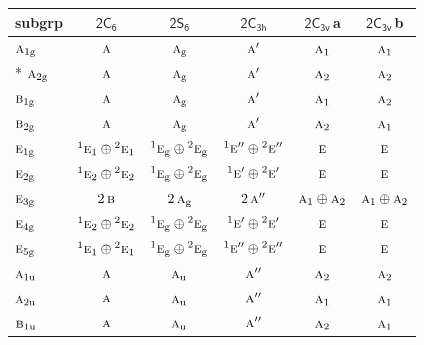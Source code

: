 \documentclass[10pt,a4paper]{article}
\numberwithin{equation}{section}
\newcommand{\grp}[1]{\mathsf{#1}}
\newcommand{\irr}[1]{\text{\normalfont\scshape #1}}
\newcommand{\conjpair}[1]{{}^{#1}}
\newcommand{\ptag}[1]{\mathrm{#1}}
\newcommand{\clsletter}[1]{\,{\scriptsize\color{black!55}#1}}
\begin{document}
{\small\begin{longtable}{@{}lccccc@{}}\toprule
subgrp & \href{2C6.pdf}{$\grp{2C_{6}}$} & \href{2S6.pdf}{$\grp{2S_{6}}$} & \href{2C3h.pdf}{$\grp{2C_{3h}}$} & \href{2C3v.pdf}{$\grp{2C_{3v}}$}\clsletter{a} & \href{2C3v.pdf}{$\grp{2C_{3v}}$}\clsletter{b}\\\midrule\endhead
\bottomrule\endfoot\endlastfoot
$\irr{a}_{1\ptag{g}}$ & $\irr{a}$ & $\irr{a}_{\ptag{g}}$ & $\irr{a}'$ & $\irr{a}_{1}$ & $\irr{a}_{1}$\\*
$\irr{a}_{2\ptag{g}}$ & $\irr{a}$ & $\irr{a}_{\ptag{g}}$ & $\irr{a}'$ & $\irr{a}_{2}$ & $\irr{a}_{2}$\\
$\irr{b}_{1\ptag{g}}$ & $\irr{a}$ & $\irr{a}_{\ptag{g}}$ & $\irr{a}'$ & $\irr{a}_{1}$ & $\irr{a}_{2}$\\
$\irr{b}_{2\ptag{g}}$ & $\irr{a}$ & $\irr{a}_{\ptag{g}}$ & $\irr{a}'$ & $\irr{a}_{2}$ & $\irr{a}_{1}$\\
$\irr{e}_{1\ptag{g}}$ & $\conjpair{1}\irr{e}_{1}\oplus \conjpair{2}\irr{e}_{1}$ & $\conjpair{1}\irr{e}_{\ptag{g}}\oplus \conjpair{2}\irr{e}_{\ptag{g}}$ & $\conjpair{1}\irr{e}''\oplus \conjpair{2}\irr{e}''$ & $\irr{e}$ & $\irr{e}$\\
$\irr{e}_{2\ptag{g}}$ & $\conjpair{1}\irr{e}_{2}\oplus \conjpair{2}\irr{e}_{2}$ & $\conjpair{1}\irr{e}_{\ptag{g}}\oplus \conjpair{2}\irr{e}_{\ptag{g}}$ & $\conjpair{1}\irr{e}'\oplus \conjpair{2}\irr{e}'$ & $\irr{e}$ & $\irr{e}$\\
$\irr{e}_{3\ptag{g}}$ & $2\,\irr{b}$ & $2\,\irr{a}_{\ptag{g}}$ & $2\,\irr{a}''$ & $\irr{a}_{1}\oplus \irr{a}_{2}$ & $\irr{a}_{1}\oplus \irr{a}_{2}$\\
$\irr{e}_{4\ptag{g}}$ & $\conjpair{1}\irr{e}_{2}\oplus \conjpair{2}\irr{e}_{2}$ & $\conjpair{1}\irr{e}_{\ptag{g}}\oplus \conjpair{2}\irr{e}_{\ptag{g}}$ & $\conjpair{1}\irr{e}'\oplus \conjpair{2}\irr{e}'$ & $\irr{e}$ & $\irr{e}$\\
$\irr{e}_{5\ptag{g}}$ & $\conjpair{1}\irr{e}_{1}\oplus \conjpair{2}\irr{e}_{1}$ & $\conjpair{1}\irr{e}_{\ptag{g}}\oplus \conjpair{2}\irr{e}_{\ptag{g}}$ & $\conjpair{1}\irr{e}''\oplus \conjpair{2}\irr{e}''$ & $\irr{e}$ & $\irr{e}$\\
$\irr{a}_{1\ptag{u}}$ & $\irr{a}$ & $\irr{a}_{\ptag{u}}$ & $\irr{a}''$ & $\irr{a}_{2}$ & $\irr{a}_{2}$\\
$\irr{a}_{2\ptag{u}}$ & $\irr{a}$ & $\irr{a}_{\ptag{u}}$ & $\irr{a}''$ & $\irr{a}_{1}$ & $\irr{a}_{1}$\\
$\irr{b}_{1\ptag{u}}$ & $\irr{a}$ & $\irr{a}_{\ptag{u}}$ & $\irr{a}''$ & $\irr{a}_{2}$ & $\irr{a}_{1}$\\

\end{longtable}}
\end{document}
